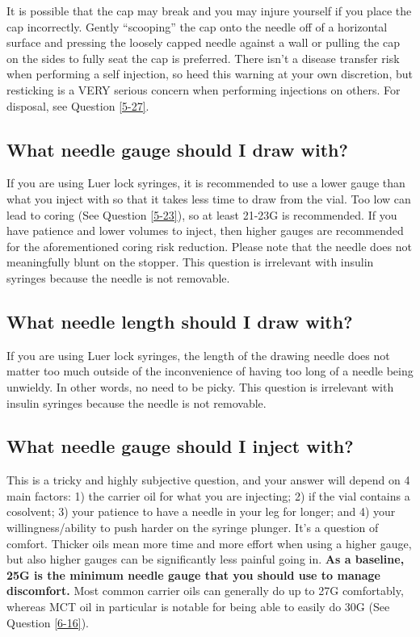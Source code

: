 \documentclass{article}
\begin{document}
It is possible that the cap may break and you may injure yourself if you place the cap incorrectly. Gently “scooping” the cap onto the needle off of a horizontal surface and pressing the loosely capped needle against a wall or pulling the cap on the sides to fully seat the cap is preferred. There isn't a disease transfer risk when performing a self injection, so heed this warning at your own discretion, but resticking is a VERY serious concern when performing injections on others. For disposal, see Question \ref{5-27}.

\subsection{What needle gauge should I draw with?}

If you are using Luer lock syringes, it is recommended to use a lower gauge than what you inject with so that it takes less time to draw from the vial. Too low can lead to coring (See Question \ref{5-23}), so at least 21-23G is recommended. If you have patience and lower volumes to inject, then higher gauges are recommended for the aforementioned coring risk reduction. Please note that the needle does not meaningfully blunt on the stopper. This question is irrelevant with insulin syringes because the needle is not removable.

\subsection{What needle length should I draw with?}

If you are using Luer lock syringes, the length of the drawing needle does not matter too much outside of the inconvenience of having too long of a needle being unwieldy. In other words, no need to be picky. This question is irrelevant with insulin syringes because the needle is not removable.

\subsection{What needle gauge should I inject with?}\label{5-16}

This is a tricky and highly subjective question, and your answer will depend on 4 main factors: 1) the carrier oil for what you are injecting; 2) if the vial contains a cosolvent; 3) your patience to have a needle in your leg for longer; and 4) your willingness/ability to push harder on the syringe plunger. It’s a question of comfort. Thicker oils mean more time and more effort when using a higher gauge, but also higher gauges can be significantly less painful going in. \textbf{As a baseline, 25G is the minimum needle gauge that you should use to manage discomfort. }Most common carrier oils can generally do up to 27G comfortably, whereas MCT oil in particular is notable for being able to easily do 30G (See Question \ref{6-16}).
\end{document}
